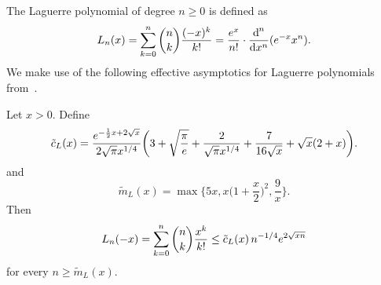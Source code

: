 \documentclass{mcom-l}
\numberwithin{equation}{section}
\numberwithin{theorem}{section} %
\begin{document}
The Laguerre polynomial of degree $n \geq 0$ is defined as
\begin{equation} \label{eq:laguerre-polynomial}
  L_n(x) = \sum_{k=0}^n \binom{n}{k} \frac{(-x)^k}{k!} = \frac{e^x}{n!} \cdot \frac{\dif^{\,n}}{\dif x^n} (e^{-x} x^n).
\end{equation}
We make use of the following effective asymptotics for Laguerre polynomials from~\cite{Borwein2008}.

\begin{proposition} \label{prop:laguerre}
  Let $x > 0$.
  Define
  \begin{equation*}
    \tilde{c}_L(x) = \frac{e^{-\frac{1}{2} x + 2\sqrt{\smash[b]{x}}}}{2\sqrt{\pi} x^{1/4}} \bigg( 3 + \sqrt{\frac{\pi}{e}} + \frac{2}{\sqrt{\pi} x^{1/4}} + \frac{7}{16 \sqrt{x}} + \sqrt{x} (2 + x) \bigg).
  \end{equation*}
  and
  \begin{equation*}
    \tilde{m}_L(x) = \max\bigg\{ 5x, x\bigg(1+\frac{x}{2} \bigg)^2, \frac{9}{x} \bigg\}.
  \end{equation*}
  Then
  \begin{equation} \label{eq:laguerre-bound}
    L_n(-x) = \sum_{k=0}^n \binom{n}{k} \frac{x^k}{k!} \leq \tilde{c}_L(x) \, n^{-1/4} e^{2\sqrt{\smash[b]{x n}}}
  \end{equation}
  for every $n \geq \tilde{m}_L(x)$.
\end{proposition}
\end{document}
